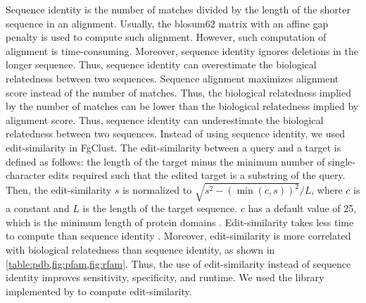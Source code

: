\documentclass[11pt,letterpaper]{article}
\begin{document}
Sequence identity is the number of matches divided by the length of the shorter sequence in an alignment.
Usually, the blosum62 matrix with an affine gap penalty is used to compute such alignment.
However, such computation of alignment is time-consuming.
Moreover, sequence identity ignores deletions in the longer sequence.
Thus, sequence identity can overestimate the biological relatedness between two sequences.
Sequence alignment maximizes alignment score instead of the number of matches.
Thus, the biological relatedness implied by the number of matches can be lower than the biological relatedness implied by alignment score.
Thus, sequence identity can underestimate the biological relatedness between two sequences.
Instead of using sequence identity, we used edit-similarity in FgClust.
The edit-similarity between a query and a target is defined as follows: 
	the length of the target minus the minimum number of single-character edits required such that the edited target is a substring of the query.
Then, the edit-similarity \(s\) is normalized to \(\sqrt{ s^2-(\min(c,s))^2}/L\), where \(c\) is a constant and \(L\) is the length of the target sequence.
\(c\) has a default value of 25, which is the minimum length of protein domains \citep[page 8]{niazi2016biosimilars}.
Edit-similarity takes less time to compute than sequence identity \citep{vsovsic2017edlib}.
Moreover, edit-similarity is more correlated with biological relatedness than sequence identity, as shown in \cref{table:pdb,fig:pfam,fig:rfam}.
Thus, the use of edit-similarity instead of sequence identity improves sensitivity, specificity, and runtime.
We used the library implemented by \citet{vsovsic2017edlib} to compute edit-similarity.
\end{document}
